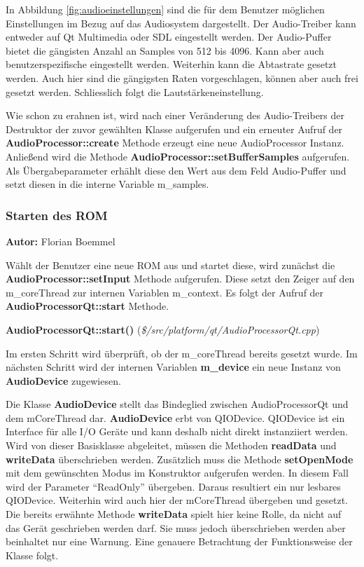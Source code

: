 \documentclass[11pt,a4paper]{scrartcl}
\newcommand{\AutorFlorian} {
    \vspace{-4mm}
    \large \textbf{Autor:} Florian Boemmel \normalsize
    \vspace{2mm}
}
\newcommand{\paratitlecode}[2] {
    \vspace{5mm}
    \large \textbf{#1} \normalsize(\textit{\${#2}})
    \vspace{2mm}\newline
}
\begin{document}
In Abbildung \ref{fig:audioeinstellungen} sind die f\"ur dem Benutzer m\"oglichen Einstellungen im Bezug auf das Audiosystem dargestellt. Der Audio-Treiber kann entweder auf Qt Multimedia oder SDL eingestellt werden.
Der Audio-Puffer bietet die g\"angisten Anzahl an Samples von 512 bis 4096. Kann aber auch benutzerspezifische eingestellt werden. Weiterhin kann die Abtastrate gesetzt werden. Auch hier sind die g\"angigsten Raten vorgeschlagen, k\"onnen
aber auch frei gesetzt werden. Schlie{ss}lich folgt die Lautst\"arkeneinstellung.

Wie schon zu erahnen ist, wird nach einer Ver\"anderung des Audio-Treibers der Destruktor der zuvor gew\"ahlten Klasse aufgerufen und ein erneuter Aufruf der \textbf{AudioProcessor::create} Methode erzeugt eine neue AudioProcessor Instanz.
Anlie{\ss}end wird die Methode \textbf{AudioProcessor::setBufferSamples} aufgerufen. Als \"Ubergabeparameter erh\"ahlt diese den Wert aus dem Feld Audio-Puffer und setzt diesen in die interne Variable m\_samples.
\newpage


\subsubsection{Starten des ROM}
\AutorFlorian

W\"ahlt der Benutzer eine neue ROM aus und startet diese, wird zun\"achst die \textbf{AudioProcessor::setInput} Methode aufgerufen. Diese setzt den Zeiger auf den m\_coreThread zur internen Variablen m\_context. Es folgt der Aufruf der
\textbf{AudioProcessorQt::start} Methode.

\paratitlecode{AudioProcessorQt::start()}{/src/platform/qt/AudioProcessorQt.cpp}
Im ersten Schritt wird \"uberpr\"uft, ob der m\_coreThread bereits gesetzt wurde. Im n\"achsten Schritt wird der internen Variablen \textbf{m\_device} ein neue Instanz von \textbf{AudioDevice} zugewiesen.

Die Klasse \textbf{AudioDevice} stellt das Bindeglied zwischen AudioProcessorQt und dem mCoreThread dar. \textbf{AudioDevice} erbt von QIODevice. QIODevice ist ein Interface f\"ur alle I/O Ger\"ate und kann deshalb nicht direkt instanziiert werden.
Wird von dieser Basisklasse abgeleitet, m\"ussen die Methoden \textbf{readData} und \textbf{writeData} \"uberschrieben werden. Zus\"atzlich muss die Methode \textbf{setOpenMode} mit dem gew\"unschten Modus im Konstruktor aufgerufen werden. In diesem Fall wird der Parameter \enquote{ReadOnly} \"ubergeben. Daraus resultiert ein nur lesbares QIODevice. Weiterhin wird auch hier der mCoreThread \"ubergeben und gesetzt. Die bereits erw\"ahnte Methode \textbf{writeData} spielt hier keine Rolle, da nicht auf das Ger\"at geschrieben werden darf. Sie muss jedoch \"uberschrieben werden aber beinhaltet nur eine Warnung. Eine genauere Betrachtung der Funktionsweise der Klasse folgt.
\end{document}

